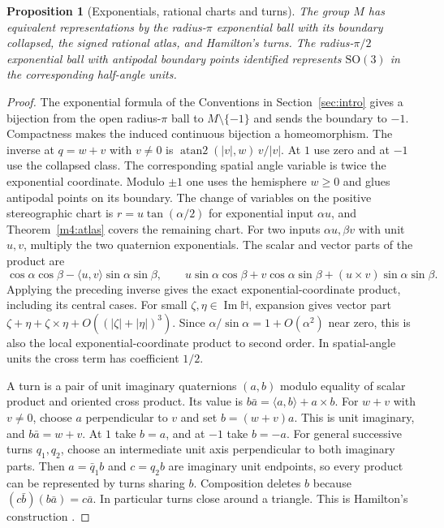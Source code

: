 \documentclass[11pt,reqno]{amsart}
\newtheorem{proposition}[theorem]{Proposition}
\theoremstyle{definition}
\theoremstyle{remark}
\numberwithin{equation}{section}
\newcommand{\HH}{\mathbb{H}}
\newcommand{\im}{\operatorname{Im}}
\newcommand{\ip}[2]{\langle #1,#2\rangle}
\newcommand{\SO}{\mathrm{SO}}
\begin{document}
\begin{proposition}[Exponentials, rational charts and turns]\label{m4:models}
The group $M$ has equivalent representations by the radius-$\pi$ exponential ball with its boundary collapsed, the signed rational atlas, and Hamilton's turns. The radius-$\pi/2$ exponential ball with antipodal boundary points identified represents $\SO(3)$ in the corresponding half-angle units.
\end{proposition}
\begin{proof}
The exponential formula of the Conventions in Section~\ref{sec:intro} gives a bijection from the open radius-$\pi$ ball to $M\setminus\{-1\}$ and sends the boundary to $-1$. Compactness makes the induced continuous bijection a homeomorphism. The inverse at $q=w+v$ with $v\ne0$ is $\operatorname{atan2}(|v|,w)\,v/|v|$. At $1$ use zero and at $-1$ use the collapsed class. The corresponding spatial angle variable is twice the exponential coordinate. Modulo $\pm1$ one uses the hemisphere $w\ge0$ and glues antipodal points on its boundary. The change of variables on the positive stereographic chart is $r=u\tan(\alpha/2)$ for exponential input $\alpha u$, and Theorem~\ref{m4:atlas} covers the remaining chart. For two inputs $\alpha u,\beta v$ with unit $u,v$, multiply the two quaternion exponentials. The scalar and vector parts of the product are
\[
 \cos\alpha\cos\beta-\ip uv\sin\alpha\sin\beta,\qquad
 u\sin\alpha\cos\beta+v\cos\alpha\sin\beta+(u\times v)\sin\alpha\sin\beta .
\]
Applying the preceding inverse gives the exact exponential-coordinate product, including its central cases. For small $\zeta,\eta\in\im\HH$, expansion gives vector part $\zeta+\eta+\zeta\times\eta+O((|\zeta|+|\eta|)^3)$. Since $\alpha/\sin\alpha=1+O(\alpha^2)$ near zero, this is also the local exponential-coordinate product to second order. In spatial-angle units the cross term has coefficient $1/2$.

A turn is a pair of unit imaginary quaternions $(a,b)$ modulo equality of scalar product and oriented cross product. Its value is $b\bar a=\ip ab+a\times b$. For $w+v$ with $v\ne0$, choose $a$ perpendicular to $v$ and set $b=(w+v)a$. This is unit imaginary, and $b\bar a=w+v$. At $1$ take $b=a$, and at $-1$ take $b=-a$. For general successive turns $q_1,q_2$, choose an intermediate unit axis perpendicular to both imaginary parts. Then $a=\bar q_1 b$ and $c=q_2 b$ are imaginary unit endpoints, so every product can be represented by turns sharing $b$. Composition deletes $b$ because $(c\bar b)(b\bar a)=c\bar a$. In particular turns close around a triangle. This is Hamilton's construction \cite{m4:Hamilton,m4:Turns}.
\end{proof}
\end{document}
